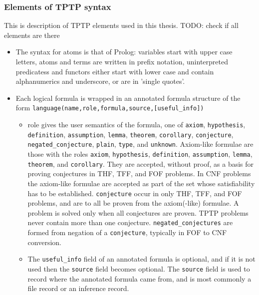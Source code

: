 \subsubsection{Elements of TPTP syntax}

This is description of TPTP elements used in this thesis. TODO: check if all elements are there

\begin{itemize}
  \item The syntax for atoms is that of Prolog: variables start with upper case letters, atoms and terms are written in prefix notation, uninterpreted predicatess and functors either start with lower case and contain alphanumerics and underscore, or are in 'single quotes'.

  \item Each logical formula is wrapped in an annotated formula structure of the form  \newline \texttt{language(name,role,formula,source,[useful_info])}

    \begin{itemize}
      \item role gives the user semantics of the formula, one of
        \texttt{axiom},
        \texttt{hypothesis},
        \texttt{definition},
        \texttt{assumption},
        \texttt{lemma},
        \texttt{theorem},
        \texttt{corollary},
        \texttt{conjecture},
        \texttt{negated_conjecture},
        \texttt{plain},
        \texttt{type},
        and \texttt{unknown}.  Axiom-like formulae are those with the roles
        \texttt{axiom},
        \texttt{hypothesis},
        \texttt{definition},
        \texttt{assumption},
        \texttt{lemma},
        \texttt{theorem},
        and \texttt{corollary}. They are accepted, without proof, as a basis for proving conjectures in THF, TFF, and FOF problems. In CNF problems the axiom-like formulae are accepted as part of the set whose satisfiability has to be established. \texttt{conjecture} occur in only THF, TFF, and FOF problems, and are to all be proven from the axiom(-like) formulae. A problem is solved only when all conjectures are proven. TPTP problems never contain more than one conjecture. \texttt{negated_conjectures} are formed from negation of a \texttt{conjecture}, typically in FOF to CNF conversion.
      \item The \texttt{useful_info} field of an annotated formula is optional, and if it is not used then the \texttt{source} field becomes optional. The \texttt{source} field is used to record where the annotated formula came from, and is most commonly a file record or an inference record.
    \end{itemize}


\end{itemize}
